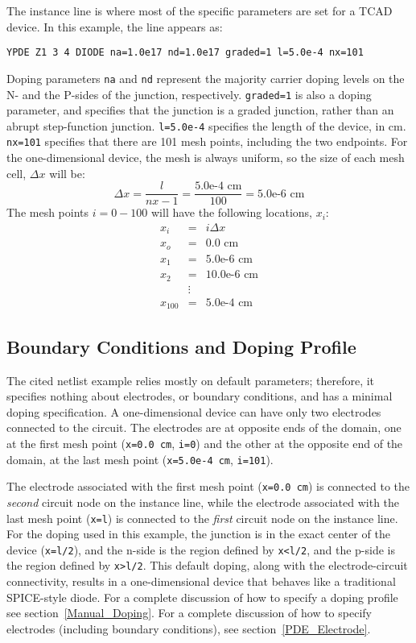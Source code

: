 The instance line is where most of the specific parameters are set for a
TCAD device.  In this example, the line appears as:

\texttt{YPDE Z1 3 4 DIODE na=1.0e17 nd=1.0e17 graded=1 l=5.0e-4 nx=101}

Doping parameters \texttt{na} and \texttt{nd} represent the
majority carrier doping levels on the N- and the P-sides of the
junction, respectively.  \texttt{graded=1} is also a doping parameter, and
specifies that the junction is a graded junction, rather than an abrupt
step-function junction.  \texttt{l=5.0e-4} specifies the length of
the device, in cm.  \texttt{nx=101} specifies that there are
101 mesh points, including the two endpoints.  For the one-dimensional
device, the mesh is always uniform, so the size of 
each mesh cell, $\Delta x$ will be:
\begin{equation}
  \Delta x = \frac{l}{nx-1} = \frac{\mbox{5.0e-4 cm}}{\mbox{100}} = \mbox{5.0e-6 cm}
\end{equation}
The mesh points $i=0 - 100$ will have the following locations, $x_{i}$:
\begin{eqnarray*}
  x_{i}   &=& i \Delta x\\
  x_{o}   &=& \mbox{0.0 cm} \\
  x_{1}   &=& \mbox{5.0e-6 cm} \\
  x_{2}   &=& \mbox{10.0e-6 cm} \\
          &\vdots& \\
  x_{100} &=& \mbox{5.0e-4 cm}
\end{eqnarray*}

\subsection{Boundary Conditions and Doping Profile}
The cited netlist example relies mostly on default parameters; therefore, it 
specifies nothing about electrodes, or boundary conditions, and has a minimal 
doping specification. A one-dimensional device can have only two electrodes 
connected to the circuit. The electrodes are at opposite ends of the domain, 
one at the first mesh point (\texttt{x=0.0 cm}, \texttt{i=0}) 
and the other at the opposite end of the domain, at the last mesh point 
(\texttt{x=5.0e-4 cm}, \texttt{i=101}).

The electrode associated with the first mesh point (\texttt{x=0.0 cm}) 
is connected to the \emph{second} circuit node on the instance line, 
while the electrode associated with the last mesh point (\texttt{x=l}) 
is connected to the \emph{first} circuit node on the instance line.  
For the doping used in this example, the junction is in the exact 
center of the device (\texttt{x=l/2}), and the n-side
is the region defined by \texttt{x<l/2}, and the p-side is the region defined by
\texttt{x>l/2}.  This default doping, along with the electrode-circuit connectivity,
results in a one-dimensional device that behaves like a traditional
SPICE-style diode.  For a complete discussion of how to specify
a doping profile see section~\ref{Manual_Doping}.  For a complete discussion
of how to specify electrodes (including boundary conditions), see
section~\ref{PDE_Electrode}.

